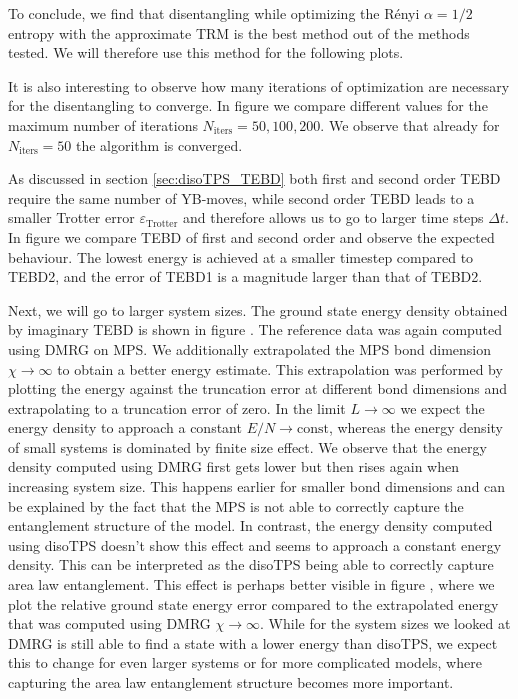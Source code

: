 To conclude, we find that disentangling while optimizing the Rényi $\alpha=1/2$ entropy with the approximate TRM is the best method out of the methods tested. We will therefore use this method for the following plots. \par

It is also interesting to observe how many iterations of optimization are necessary for the disentangling to converge. In figure \figref{} we compare different values for the maximum number of iterations $N_\text{iters} = 50, 100, 200$. We observe that already for $N_\text{iters} = 50$ the algorithm is converged. \par

As discussed in section \ref{sec:disoTPS_TEBD} both first and second order TEBD require the same number of YB-moves, while second order TEBD leads to a smaller Trotter error $\varepsilon_\text{Trotter}$ and therefore allows us to go to larger time steps $\Delta t$. In figure \figref{} we compare TEBD of first and second order and observe the expected behaviour. The lowest energy is achieved at a smaller timestep compared to TEBD2, and the error of TEBD1 is a magnitude larger than that of TEBD2. \par

Next, we will go to larger system sizes. The ground state energy density obtained by imaginary TEBD is shown in figure \figref{}. The reference data was again computed using DMRG on MPS. We additionally extrapolated the MPS bond dimension $\chi\rightarrow\infty$ to obtain a better energy estimate. This extrapolation was performed by plotting the energy against the truncation error at different bond dimensions and extrapolating to a truncation error of zero. In the limit $L\rightarrow\infty$ we expect the energy density to approach a constant $E/N\rightarrow \text{const}$, whereas the energy density of small systems is dominated by finite size effect. We observe that the energy density computed using DMRG first gets lower but then rises again when increasing system size. This happens earlier for smaller bond dimensions and can be explained by the fact that the MPS is not able to correctly capture the entanglement structure of the model. In contrast, the energy density computed using disoTPS doesn't show this effect and seems to approach a constant energy density. This can be interpreted as the disoTPS being able to correctly capture area law entanglement. This effect is perhaps better visible in figure \figref{}, where we plot the relative ground state energy error compared to the extrapolated energy that was computed using DMRG $\chi\rightarrow\infty$. While for the system sizes we looked at DMRG is still able to find a state with a lower energy than disoTPS, we expect this to change for even larger systems or for more complicated models, where capturing the area law entanglement structure becomes more important. \par
